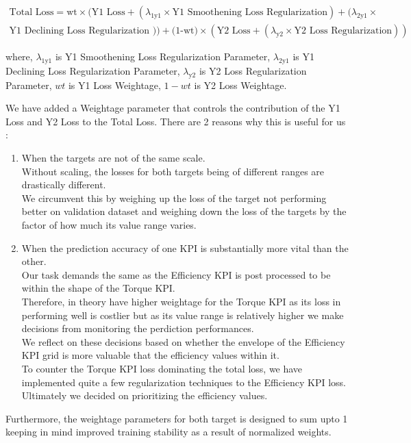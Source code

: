 \documentclass{report} %
\begin{document}
\vspace{0.2cm} %

\begin{equation}
    \begin{split}
\text{Total Loss} = \text{wt} \times (\text{Y1 Loss} + (\lambda_{\text{1y1}} \times \text{Y1 Smoothening Loss Regularization}) +  (\lambda_{\text{2y1}} \times \\
\text{Y1 Declining Loss Regularization })) + \text{(1-wt)} \times (\text{Y2 Loss} + (\lambda_{\text{y2}} \times \text{Y2 Loss Regularization}))
    \end{split}
    \label{eq:Total Loss}
\end{equation}

where, \(\lambda_{\text{1y1}}\) is Y1 Smoothening Loss Regularization Parameter, \(\lambda_{\text{2y1}}\) is Y1 Declining Loss Regularization Parameter,
        \(\lambda_{\text{y2}}\) is Y2 Loss Regularization Parameter, \(wt\) is Y1 Loss Weightage, \(1-wt\) is Y2 Loss Weightage.

We have added a Weightage parameter that controls the contribution of the Y1 Loss and Y2 Loss to the Total Loss. There are 2 reasons why this is useful for us :\\

\begin{enumerate}
    \item  When the targets are not of the same scale. \\
    Without scaling, the losses for both targets being of different ranges are drastically different.\\
    We circumvent this by weighing up the loss of the target not performing better on validation dataset and weighing down the loss of the targets by the factor of how much its value range varies. \\
    \item When the prediction accuracy of one \ac{KPI} is substantially more vital than the other. \\
    Our task demands the same as the Efficiency \ac{KPI} is post processed to be within the shape of the Torque \ac{KPI}. \\
    Therefore, in theory have higher weightage for the Torque \ac{KPI} as its loss in performing well is costlier but as its value range is relatively higher we make decisions from monitoring the perdiction performances.\\
    We reflect on these decisions based on whether the envelope of the Efficiency \ac{KPI} grid is more valuable that the efficiency values within it.\\
    To counter the Torque \ac{KPI} loss dominating the total loss, we have implemented quite a few regularization techniques to the Efficiency \ac{KPI} loss.\\
    Ultimately we decided on prioritizing the efficiency values.
\end{enumerate}
Furthermore, the weightage parameters for both target is designed to sum upto 1 keeping in mind improved training stability as a result of normalized weights. \\
\end{document}
